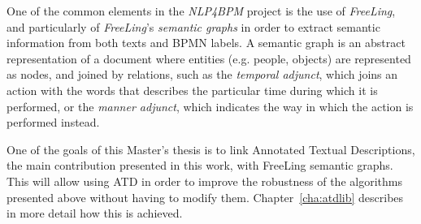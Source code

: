 One of the common elements in the \emph{NLP4BPM} project is the use of
\emph{FreeLing}, and particularly of \emph{FreeLing}'s \emph{semantic graphs} in
order to extract semantic information from both texts and BPMN labels. A
semantic graph is an abstract representation of a document where entities (e.g.
people, objects) are represented as nodes, and joined by relations, such as the
\emph{temporal adjunct}, which joins an action with the words that describes the
particular time during which it is performed, or the \emph{manner adjunct},
which indicates the way in which the action is performed instead.

One of the goals of this Master's thesis is to link Annotated Textual
Descriptions, the main contribution presented in this work, with FreeLing
semantic graphs. This will allow using ATD in order to improve the robustness of
the algorithms presented above without having to modify them.
Chapter~\ref{cha:atdlib} describes in more detail how this is achieved.

